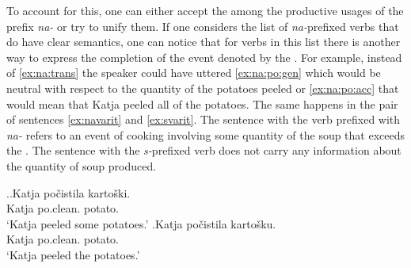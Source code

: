 %
%

To account for this, one can either accept the  among the productive usages of the prefix \textit{na-} or try to unify them. If one considers the list of \textit{na-}prefixed verbs that do have clear  semantics, one can notice that for verbs in this list there is another way to express the completion of the event denoted by the . For example, instead of \ref{ex:na:trans} the speaker could have uttered \ref{ex:na:po:gen} which would be neutral with respect to the quantity of the potatoes peeled or \ref{ex:na:po:acc} that would mean that Katja peeled all of the potatoes. The same happens in the pair of sentences \ref{ex:navarit} and \ref{ex:svarit}. The sentence with the verb prefixed with \textit{na-} refers to an event of cooking involving some quantity of the soup that exceeds the . The sentence with the \textit{s-}prefixed verb does not carry any information about the quantity of soup produced.

\ex.\label{ex:na:po}\ag.\label{ex:na:po:gen}Katja po\v{c}istila karto\v{s}ki.\\
Katja po.clean. potato.\\
\trans `Katja peeled some potatoes.'
\bg.\label{ex:na:po:acc}Katja po\v{c}istila karto\v{s}ku.\\
Katja po.clean. potato.\\
\trans `Katja peeled the potatoes.'

